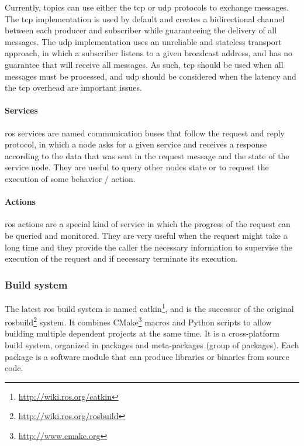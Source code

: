 Currently, topics can use either the \gls{tcp} or \gls{udp} protocols to exchange messages. The \gls{tcp} implementation is used by default and creates a bidirectional channel between each producer and subscriber while guaranteeing the delivery of all messages. The \gls{udp} implementation uses an unreliable and stateless transport approach, in which a subscriber listens to a given broadcast address, and has no guarantee that will receive all messages. As such, \gls{tcp} should be used when all messages must be processed, and \gls{udp} should be considered when the latency and the \gls{tcp} overhead are important issues.


\paragraph{Services}

\gls{ros} services are named communication buses that follow the request and reply protocol, in which a node asks for a given service and receives a response according to the data that was sent in the request message and the state of the service node. They are useful to query other nodes state or to request the execution of some behavior / action.


\paragraph{Actions}

\gls{ros} actions are a special kind of service in which the progress of the request can be queried and monitored. They are very useful when the request might take a long time and they provide the caller the necessary information to supervise the execution of the request and if necessary terminate its execution.


\subsubsection{Build system}

The latest \gls{ros} build system is named catkin\footnote{\url{http://wiki.ros.org/catkin}}, and is the successor of the original rosbuild\footnote{\url{http://wiki.ros.org/rosbuild}} system. It combines CMake\footnote{\url{http://www.cmake.org}} macros and Python scripts to allow building multiple dependent projects at the same time. It is a cross-platform build system, organized in packages and meta-packages (group of packages). Each package is a software module that can produce libraries or binaries from source code.

